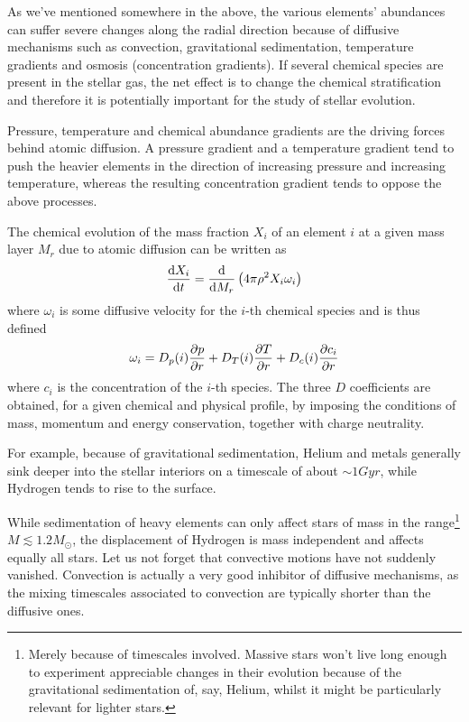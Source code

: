 As we've mentioned somewhere in the above, the various elements' abundances can suffer severe changes along the radial direction because of diffusive mechanisms such as convection, gravitational sedimentation, temperature gradients and osmosis (concentration gradients). If several chemical species are present in the stellar gas, the net effect is to change the chemical stratification and therefore it is potentially important for the study of stellar evolution.
\par Pressure, temperature and chemical abundance gradients are the driving forces behind atomic diffusion. A pressure gradient and a temperature gradient tend to push the heavier elements in the direction of increasing pressure and increasing temperature, whereas the resulting concentration gradient tends to oppose the above processes.
\par The chemical evolution of the mass fraction $X_{i}$ of an element $i$ at a given mass layer $M_{r}$ due to atomic diffusion can be written as 
\begin{equation*}
    \frac{\text{d}X_{i}}{\text{d}t} = \frac{\text{d}}{\text{d}M_{r}}\left(4\pi\rho^{2}X_{i}\omega_{i}\right)
\end{equation*}
where $\omega_{i}$ is some diffusive velocity for the $i$-th chemical species and is thus defined
\begin{equation*}
    \omega_{i} = D_{p}(i)\frac{\partial p}{\partial r}+D_{T}(i)\frac{\partial T}{\partial r}+D_{c}(i)\frac{\partial c_{i}}{\partial r}
\end{equation*}
where $c_{i}$ is the concentration of the $i$-th species. The three $D$ coefficients are obtained, for a given chemical and physical profile, by imposing the conditions of mass, momentum and energy conservation, together with charge neutrality.
\par For example, because of gravitational sedimentation, Helium and metals generally sink deeper into the stellar interiors on a timescale of about $\sim 1\unit{Gyr}$, while Hydrogen tends to rise to the surface.
\par While sedimentation of heavy elements can only affect stars of mass in the range\footnote{Merely because of timescales involved. Massive stars won't live long enough to experiment appreciable changes in their evolution because of the gravitational sedimentation of, say, Helium, whilst it might be particularly relevant for lighter stars.} $M \lesssim 1.2M_{\odot}$, the displacement of Hydrogen is mass independent and affects equally all stars. Let us not forget that convective motions have not suddenly vanished. Convection is actually a very good inhibitor of diffusive mechanisms, as the mixing timescales associated to convection are typically shorter than the diffusive ones.
